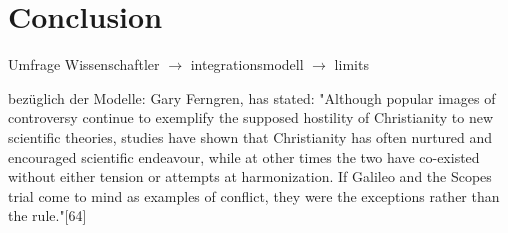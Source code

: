 \section{Conclusion}
\label{sec:Conclusion}


Umfrage Wissenschaftler \(\to\) integrationsmodell \(\to\) limits

bezüglich der Modelle:
Gary Ferngren, has stated: "Although popular images of controversy continue to exemplify the supposed hostility of Christianity to new scientific theories, studies have shown that Christianity has often nurtured and encouraged scientific endeavour, while at other times the two have co-existed without either tension or attempts at harmonization. If Galileo and the Scopes trial come to mind as examples of conflict, they were the exceptions rather than the rule."[64]
